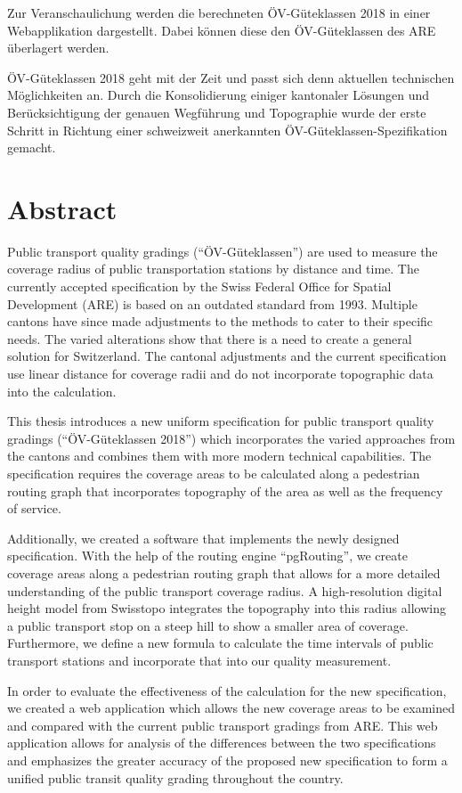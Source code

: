 Zur Veranschaulichung werden die berechneten ÖV-Güteklassen 2018 in einer
Webapplikation dargestellt.
Dabei können diese den ÖV-Güteklassen des ARE überlagert werden.

ÖV-Güteklassen 2018 geht mit der Zeit und passt sich denn aktuellen technischen Möglichkeiten an.
Durch die Konsolidierung einiger kantonaler Lösungen und Berücksichtigung der genauen Wegführung und Topographie wurde der erste Schritt in Richtung einer schweizweit anerkannten ÖV-Güteklassen-Spezifikation gemacht.

\cleardoublepage

\chapter*{Abstract}

Public transport quality gradings ("`ÖV-Güteklassen"') are used to measure the coverage radius of public transportation stations by distance and time.
The currently accepted specification by the Swiss Federal Office for Spatial Development (ARE) is based on an outdated standard from 1993.
Multiple cantons have since made adjustments to the methods to cater to their specific needs.
The varied alterations show that there is a need to create a general solution for Switzerland.
The cantonal adjustments and the current specification use linear distance for coverage radii and do not incorporate topographic data into the calculation.

This thesis introduces a new uniform specification for public transport quality gradings ("`ÖV-Güteklassen 2018"') which incorporates the varied approaches from the cantons and combines them with more modern technical capabilities.
The specification requires the coverage areas to be calculated along a pedestrian routing graph that incorporates topography of the area as well as the frequency of service.

Additionally, we created a software that implements the newly designed specification.
With the help of the routing engine "`pgRouting"', we create coverage areas along a pedestrian routing graph that allows for a more detailed understanding of the public transport coverage radius.
A high-resolution digital height model from Swisstopo integrates the topography into this radius allowing a public transport stop on a steep hill to show a smaller area of coverage.
Furthermore, we define a new formula to calculate the time intervals of public transport stations and incorporate that into our quality measurement.

In order to evaluate the effectiveness  of the calculation for the new specification, we created a web application which allows the new coverage areas to be examined and compared with the current public transport gradings from ARE.
This web application allows for analysis of the differences between the two specifications and emphasizes the greater accuracy of the proposed new specification to form a unified public transit quality grading throughout the country.